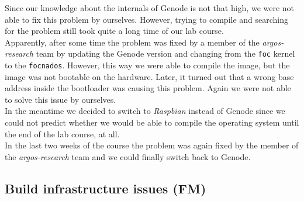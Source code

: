 Since our knowledge about the internals of Genode is not that high, we were not able to fix this problem by ourselves. However, trying to compile and searching for the problem still took quite a long time of our lab course. \\

Apparently, after some time the problem was fixed by a member of the \textit{argos-research} team by updating the Genode version and changing from the \texttt{foc} kernel to the \texttt{focnados}. However, this way we were able to compile the image, but the image was not bootable on the hardware. Later, it turned out that a wrong base address inside the bootloader was causing this problem. Again we were not able to solve this issue by ourselves. \\

In the meantime we decided to switch to \textit{Raspbian} instead of Genode since we could not predict whether we would be able to compile the operating system until the end of the lab course, at all. \\

In the last two weeks of the course the problem was again fixed by the member of the \textit{argos-research} team and we could finally switch back to Genode.


\subsection{Build infrastructure issues (FM)}
